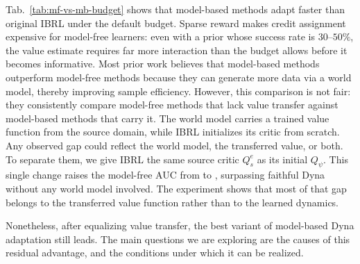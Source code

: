 \documentclass{article} %
\begin{document}
Tab.~\ref{tab:mf-vs-mb-budget} shows that model-based methods adapt faster than original IBRL under the default budget. Sparse reward makes credit assignment expensive for model-free learners: even with a prior whose success rate is $30$--$50\%$, the value estimate requires far more interaction than the budget allows before it becomes informative. Most prior work believes that model-based methods outperform model-free methods because they can generate more data via a world model, thereby improving sample efficiency. However, this comparison is not fair: they consistently compare model-free methods that lack value transfer against model-based methods that carry it. The world model carries a trained value function from the source domain, while IBRL initializes its critic from scratch. Any observed gap could reflect the world model, the transferred value, or both. To separate them, we give IBRL the same source critic $Q^e_s$ as its initial $Q_\psi$. This single change raises the model-free AUC from  to  , surpassing faithful Dyna  without any world model involved. The experiment shows that most of that gap belongs to the transferred value function rather than to the learned dynamics.

Nonetheless, after equalizing value transfer, the best variant of model-based Dyna adaptation still leads. The main questions we are exploring are the causes of this residual advantage, and the conditions under which it can be realized.
\end{document}
